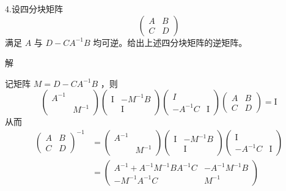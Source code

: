 \documentclass[12pt,hyperref,]{ctexart}
\begin{document}
\vspace{3em}

\kaishu

4.设四分块矩阵 \begin{equation*}
\begin{pmatrix}
A & B \\
C & D
\end{pmatrix}
\end{equation*}满足 \(A\) 与 \(D-CA^{-1}B\)
均可逆。给出上述四分块矩阵的逆矩阵。 \vspace{1em}

\heiti

解

\songti

记矩阵 \(M=D-CA^{-1}B\) ，则 \begin{equation*}
\begin{pmatrix}
A^{-1} & \\
 & M^{-1}
\end{pmatrix}\begin{pmatrix}
\mathrm{I} & -M^{-1}B \\
 & \mathrm{I}
\end{pmatrix}\begin{pmatrix}
I & \\
-A^{-1}C & \mathrm{I}
\end{pmatrix}\begin{pmatrix}
A & B \\
C & D
\end{pmatrix}=\mathrm{I}
\end{equation*}从而 \begin{equation*}
\begin{aligned}
\begin{pmatrix}
A & B \\
C & D
\end{pmatrix}^{-1} & =
\begin{pmatrix}
A^{-1} & \\
 & M^{-1}
\end{pmatrix}\begin{pmatrix}
\mathrm{I} & -M^{-1}B \\
 & \mathrm{I}
\end{pmatrix}\begin{pmatrix}
\mathrm{I} & \\
-A^{-1}C & \mathrm{I}
\end{pmatrix} \\ & =
\begin{pmatrix}
A^{-1}+A^{-1}M^{-1}BA^{-1}C & -A^{-1}M^{-1}B \\
-M^{-1}A^{-1}C & M^{-1}
\end{pmatrix}
\end{aligned}
\end{equation*}
\end{document}
